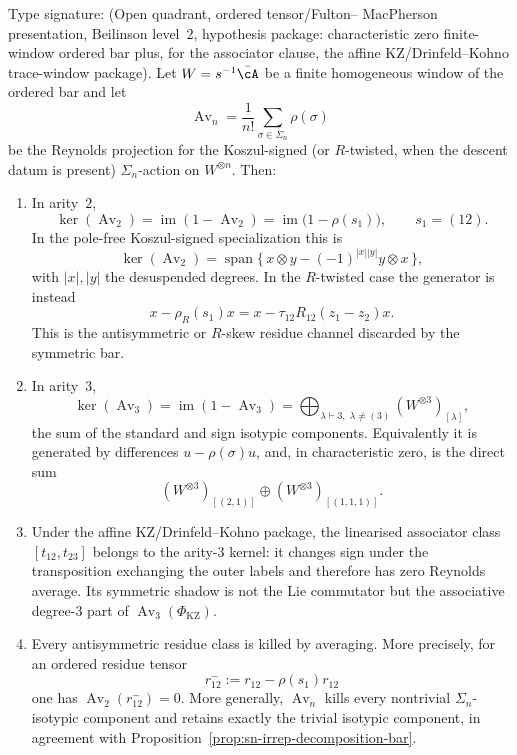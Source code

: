 \begin{proposition}
\label{prop:ordered-bar-low-arity-averaging-kernels}
Type signature: \textup{(}Open quadrant, ordered tensor/Fulton--
MacPherson presentation, Beilinson level~$2$, hypothesis package:
characteristic zero finite-window ordered bar plus, for the
associator clause, the affine KZ/Drinfeld--Kohno trace-window
package\textup{)}.
Let $W=s^{-1}\bar\cA$ be a finite homogeneous window of the ordered bar
and let
\[
\operatorname{Av}_n=\frac1{n!}\sum_{\sigma\in\Sigma_n}\rho(\sigma)
\]
be the Reynolds projection for the Koszul-signed
\textup{(}or $R$-twisted, when the descent datum is present\textup{)}
$\Sigma_n$-action on $W^{\otimes n}$. Then:
\begin{enumerate}[label=\textup{(\roman*)}]
\item In arity~$2$,
\begin{equation}\label{eq:arity-two-averaging-kernel}
\ker(\operatorname{Av}_2)
=\operatorname{im}(1-\operatorname{Av}_2)
=\operatorname{im}\bigl(1-\rho(s_1)\bigr),
\qquad s_1=(12).
\end{equation}
In the pole-free Koszul-signed specialization this is
\[
\ker(\operatorname{Av}_2)
=
\operatorname{span}\{\,x\otimes y
-(-1)^{|x||y|}y\otimes x\,\},
\]
with $|x|,|y|$ the desuspended degrees. In the \(R\)-twisted case the
generator is instead
\[
x-\rho_R(s_1)x
=x-\tau_{12}R_{12}(z_1-z_2)x .
\]
This is the antisymmetric or \(R\)-skew residue channel discarded by
the symmetric bar.
\item In arity~$3$,
\begin{equation}\label{eq:arity-three-averaging-kernel}
\ker(\operatorname{Av}_3)
=
\operatorname{im}(1-\operatorname{Av}_3)
=
\bigoplus_{\lambda\vdash3,\;\lambda\ne(3)}
(W^{\otimes3})_{[\lambda]},
\end{equation}
the sum of the standard and sign isotypic components. Equivalently it
is generated by differences \(u-\rho(\sigma)u\), and, in characteristic
zero, is the direct sum
\[
(W^{\otimes3})_{[(2,1)]}\oplus(W^{\otimes3})_{[(1,1,1)]}.
\]
\item Under the affine KZ/Drinfeld--Kohno package, the linearised
associator class $[t_{12},t_{23}]$ belongs to the arity-$3$ kernel:
it changes sign under the transposition exchanging the outer labels
and therefore has zero Reynolds average. Its symmetric shadow is not
the Lie commutator but the associative degree-$3$ part of
$\operatorname{Av}_3(\Phi_{\mathrm{KZ}})$.
\item Every antisymmetric residue class is killed by averaging. More
precisely, for an ordered residue tensor
\[
r^-_{12}:=r_{12}-\rho(s_1)r_{12}
\]
one has \(\operatorname{Av}_2(r^-_{12})=0\). More generally,
\(\operatorname{Av}_n\) kills every nontrivial
$\Sigma_n$-isotypic component and retains exactly the trivial
isotypic component, in agreement with
Proposition~\ref{prop:sn-irrep-decomposition-bar}.
\end{enumerate}
\end{proposition}

